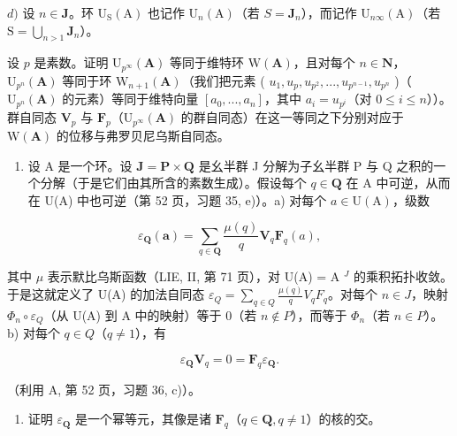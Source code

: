 \(d)\) 设 \(n \in \mathbf{J}\)。环 \(\mathrm{U}_{\mathrm{S}}(\mathrm{A})\) 也记作 \(\mathrm{U}_{n}(\mathrm{A})\)（若 \(S = \mathbf{J}_{n}\)），而记作 \(\mathrm{U}_{n\infty}(\mathrm{A})\)（若 \(\mathrm{S} = \bigcup_{n > 1} \mathbf{J}_{n}\)）。

设 \(p\) 是素数。证明 \(\mathrm{U}_{p^{\infty}}(\mathbf{A})\) 等同于维特环 \(\mathrm{W}(\mathbf{A})\)，且对每个 \(n \in \mathbf{N}\)，\(\mathrm{U}_{p^n}(\mathbf{A})\) 等同于环 \(\mathrm{W}_{n+1}(\mathbf{A})\)（我们把元素 ( \(u_1, u_p, u_{p^2}, ..., u_{p^{n-1}}, u_{p^n}\) )（\(\mathrm{U}_{p^n}(\mathbf{A})\) 的元素）等同于维特向量 \([a_0, ..., a_n]\)，其中 \(a_i = u_{p^i}\)（对 \(0 \leqslant i \leqslant n\)））。群自同态 \(\mathbf{V}_p\) 与 \(\mathbf{F}_p\)（\(\mathrm{U}_{p^\infty}(\mathbf{A})\) 的群自同态）在这一等同之下分别对应于 \(\mathrm{W}(\mathbf{A})\) 的位移与弗罗贝尼乌斯自同态。

\begin{enumerate}
\def\labelenumi{\arabic{enumi})}
\setcounter{enumi}{39}
\tightlist
\item
  设 A 是一个环。设 \(\mathbf{J} = \mathbf{P} \times \mathbf{Q}\) 是幺半群 J 分解为子幺半群 P 与 Q 之积的一个分解（于是它们由其所含的素数生成）。假设每个 \(q \in \mathbf{Q}\) 在 A 中可逆，从而在 U(A) 中也可逆（第 52 页，习题 35, e)）。a) 对每个 \(a \in \mathrm{U(A)}\)，级数
\end{enumerate}

\[
\varepsilon_ {\mathbf {Q}} (\boldsymbol {a}) = \sum_ {q \in \mathbf {Q}} \frac {\mu (q)}{q} \mathbf {V} _ {q} \mathbf {F} _ {q} (a),
\]

其中 \(\mu\) 表示默比乌斯函数（LIE, II, 第 71 页），对 U(A) = A \(^{J}\) 的乘积拓扑收敛。于是这就定义了 U(A) 的加法自同态 \(\varepsilon_{Q} = \sum_{q \in Q} \frac{\mu(q)}{q} V_{q} F_{q}\)。对每个 \(n \in J\)，映射 \(\Phi_{n} \circ \varepsilon_{Q}\)（从 U(A) 到 A 中的映射）等于 0（若 \(n \notin P\)），而等于 \(\Phi_{n}\)（若 \(n \in P\)）。b) 对每个 \(q \in Q\)（\(q \neq 1\)），有

\[
\varepsilon_ {\mathbf {Q}} \mathbf {V} _ {q} = 0 = \mathbf {F} _ {q} \varepsilon_ {\mathbf {Q}}.
\]

（利用 A, 第 52 页，习题 36, c)）。

\begin{enumerate}
\def\labelenumi{\alph{enumi})}
\setcounter{enumi}{2}
\tightlist
\item
  证明 \(\varepsilon_{\mathbf{Q}}\) 是一个幂等元，其像是诸 \(\mathbf{F}_{q}\)（\(q \in \mathbf{Q}, q \neq 1\)）的核的交。
\end{enumerate}

